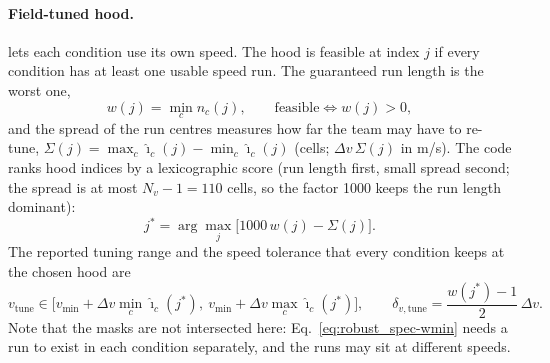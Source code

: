 \paragraph{Field-tuned hood.}
 lets each condition use its own speed.
The hood is feasible at index $j$ if every condition has at least one usable speed run.
The guaranteed run length is the worst one,
\begin{equation}
  w(j) = \min_c n_c(j),\qquad \text{feasible}\iff w(j)>0 ,
  \label{eq:robust_spec-wmin}
\end{equation}
and the spread of the run centres measures how far the team may have to re-tune,
$\Sigma(j) = \max_c \hat\imath_c(j) - \min_c \hat\imath_c(j)$ (cells; $\Delta v\,\Sigma(j)$ in \unit{m/s}).
The code ranks hood indices by a lexicographic score (run length first, small spread second; the
spread is at most $N_v-1=110$ cells, so the factor 1000 keeps the run length dominant):
\begin{equation}
  j^\ast = \arg\max_j \Big[1000\,w(j) - \Sigma(j)\Big].
  \label{eq:robust_spec-score}
\end{equation}
The reported tuning range and the speed tolerance that every condition keeps at the chosen hood are
\begin{equation}
  v_{\mathrm{tune}}\in\Big[v_{\min}+\Delta v\min_c\hat\imath_c(j^\ast),\
                          v_{\min}+\Delta v\max_c\hat\imath_c(j^\ast)\Big],\qquad
  \delta_{v,\mathrm{tune}} = \frac{w(j^\ast)-1}{2}\,\Delta v .
  \label{eq:robust_spec-tune}
\end{equation}
Note that the masks are not intersected here: Eq.~\eqref{eq:robust_spec-wmin} needs a run to exist in each
condition separately, and the runs may sit at different speeds.

